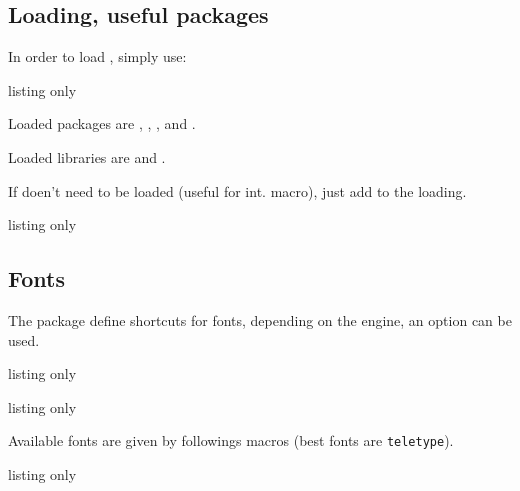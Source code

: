 \documentclass[11pt,a4paper]{ltxdoc}
\begin{document}
\subsection{Loading, useful packages}

In order to load , simply use:

\begin{DemoCode}{listing only}
\usepackage{calculatoritems}
\end{DemoCode}

Loaded packages are , , ,  and .

Loaded libraries are  and .

\smallskip

If  doen't need to be loaded (useful for int. macro), just add \ShowCode{[noamssymb]} to the loading.

\begin{DemoCode}{listing only}
\usepackage[noamssymb]{calculatoritems}
\end{DemoCode}

\subsection{Fonts}

The package define shortcuts for fonts, depending on the engine, an option \ShowCode{[xelua]} can be used.

\begin{DemoCode}{listing only}
\usepackage{calculatoritems}
\end{DemoCode}

\begin{DemoCode}{listing only}
\usepackage[xelua]{calculatoritems}
\end{DemoCode}

Available fonts are given by followings macros (best fonts are \texttt{teletype}).

\begin{DemoCode}{listing only}
\newcommand\fontNWKS{%
  \fontencoding{T1}\fontfamily{SourceCodePro-TLF}\selectfont %
}
\newcommand\fontCASIOA{%
  \fontencoding{T1}\fontfamily{AnonymousPro}\fontseries{sb}\selectfont %
}
\newcommand\fontCASIOB{%
  \fontencoding{T1}\fontfamily{AlegreyaSans-TLF}\fontseries{sb}\selectfont %
}
\newcommand\fontTI{%
  \fontencoding{T1}\fontfamily{AnonymousPro}\fontseries{sb}\selectfont %
}
\newcommand\fontHP{%
  \fontencoding{T1}\fontfamily{AlegreyaSans-TLF}\fontseries{sb}\selectfont %
}
\end{DemoCode}
\end{document}
